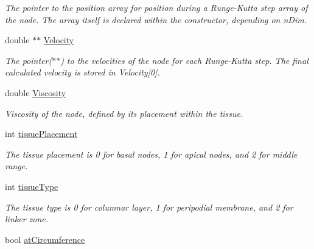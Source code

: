 \begin{DoxyCompactItemize}
\begin{DoxyCompactList}\small\item\em The pointer to the position array for position during a Runge-\/\+Kutta step array of the node. The array itself is declared within the constructor, depending on n\+Dim. \end{DoxyCompactList}\item 
\hypertarget{classNode_ac27dee69b570030aacf8865190879845}{}double $\ast$$\ast$ \hyperlink{classNode_ac27dee69b570030aacf8865190879845}{Velocity}\label{classNode_ac27dee69b570030aacf8865190879845}

\begin{DoxyCompactList}\small\item\em The pointer($\ast$$\ast$) to the velocities of the node for each Runge-\/\+Kutta step. The final calculated velocity is stored in Velocity\mbox{[}0\mbox{]}. \end{DoxyCompactList}\item 
\hypertarget{classNode_a69fe9806911156a4b9db8d2aca1b6328}{}double \hyperlink{classNode_a69fe9806911156a4b9db8d2aca1b6328}{Viscosity}\label{classNode_a69fe9806911156a4b9db8d2aca1b6328}

\begin{DoxyCompactList}\small\item\em Viscosity of the node, defined by its placement within the tissue. \end{DoxyCompactList}\item 
\hypertarget{classNode_af754322e3928dc45f70b19762551890a}{}int \hyperlink{classNode_af754322e3928dc45f70b19762551890a}{tissue\+Placement}\label{classNode_af754322e3928dc45f70b19762551890a}

\begin{DoxyCompactList}\small\item\em The tissue placement is 0 for basal nodes, 1 for apical nodes, and 2 for middle range. \end{DoxyCompactList}\item 
\hypertarget{classNode_ae621097f98f1d33d283cf65a0a02d29a}{}int \hyperlink{classNode_ae621097f98f1d33d283cf65a0a02d29a}{tissue\+Type}\label{classNode_ae621097f98f1d33d283cf65a0a02d29a}

\begin{DoxyCompactList}\small\item\em The tissue type is 0 for columnar layer, 1 for peripodial membrane, and 2 for linker zone. \end{DoxyCompactList}\item 
\hypertarget{classNode_ab6b225354ad961f2e9bd5d7fe9b67b3a}{}bool \hyperlink{classNode_ab6b225354ad961f2e9bd5d7fe9b67b3a}{at\+Circumference}\label{classNode_ab6b225354ad961f2e9bd5d7fe9b67b3a}


\end{DoxyCompactItemize}
